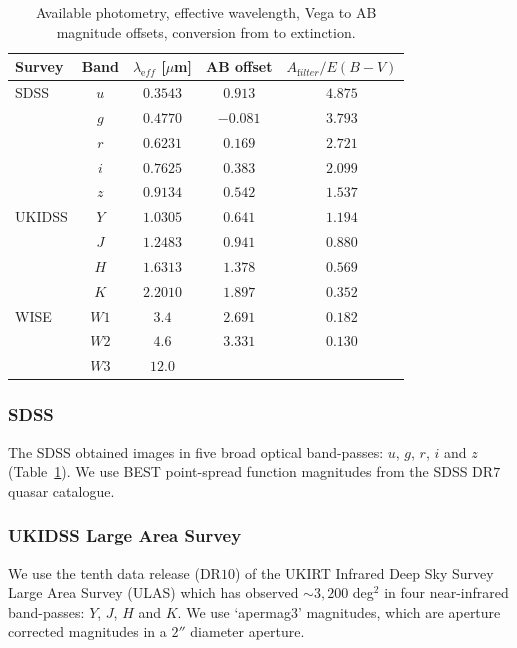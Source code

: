 \begin{table}
  \footnotesize
  \centering
  \begin{tabular}{lcccc}
    \hline 
    Survey & Band & $\lambda_{\mathrm eff}$ [$\mu$m] & AB offset & $A_{\mathrm filter}/E(B-V)$ \\
    \hline 
    SDSS & $u$ & $0.3543$ & $ 0.913$ & $4.875$ \\
         & $g$ & $0.4770$ & $-0.081$ & $3.793$ \\
         & $r$ & $0.6231$ & $ 0.169$ & $2.721$ \\
         & $i$ & $0.7625$ & $ 0.383$ & $2.099$ \\
         & $z$ & $0.9134$ & $ 0.542$ & $1.537$ \\
    UKIDSS & $Y$ & $1.0305$ &  $0.641$ & $1.194$ \\
           & $J$ & $1.2483$ &  $0.941$ & $0.880$ \\
           & $H$ & $1.6313$ &  $1.378$ & $0.569$ \\
           & $K$ & $2.2010$ &  $1.897$ & $0.352$ \\
    WISE & $W1$ & $3.4$ & $2.691$ & $0.182$\\
         & $W2$ & $4.6$ & $3.331$ & $0.130$\\
         & $W3$ & $12.0$ & & \\           
    \hline
  \end{tabular}
  \caption[{Available photometry, effective wavelength, Vega to AB magnitude offsets, conversion from \ebv to extinction.}]{Available photometry, effective wavelength, Vega to AB magnitude offsets, conversion from \ebv to extinction. }
  \label{tab:photometry}
\end{table}

\subsubsection{SDSS}

The SDSS obtained images in five broad optical band-passes: $u$, $g$, $r$, $i$ and $z$ (Table~\ref{tab:photometry}).  
We use BEST point-spread function magnitudes from the SDSS DR$7$ quasar catalogue.

\subsubsection{UKIDSS Large Area Survey}

We use the tenth data release (DR$10$) of the UKIRT Infrared Deep Sky Survey \citep[UKIDSS;][]{lawrence07} Large Area Survey (ULAS) which has observed $\sim 3,200$ deg$^2$ in four near-infrared band-passes: $Y$, $J$, $H$ and $K$. 
We use `apermag3' magnitudes, which are aperture corrected magnitudes in a $2''$ diameter aperture.

